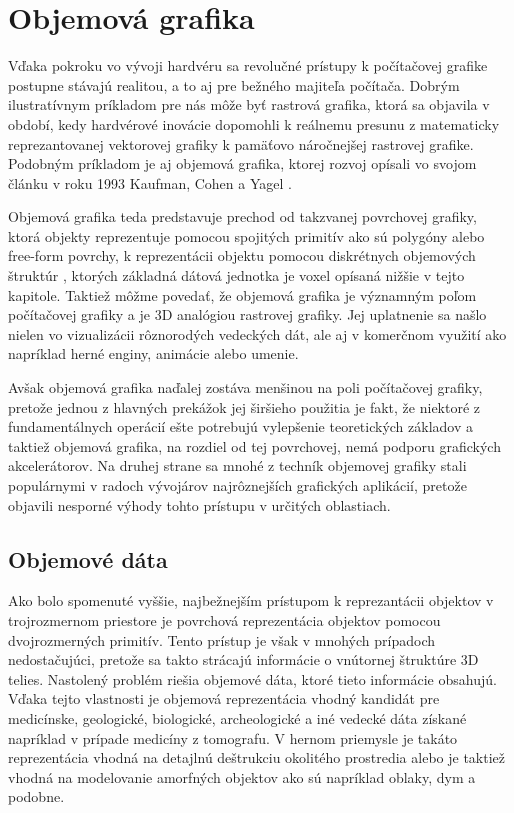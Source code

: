 \chapter{Objemová grafika}\label{chap:grafika}
Vďaka pokroku vo vývoji hardvéru sa revolučné prístupy k počítačovej grafike postupne stávajú realitou, a to aj pre bežného majiteľa počítača. Dobrým ilustratívnym príkladom pre nás môže byť rastrová grafika, ktorá sa objavila v období, kedy hardvérové inovácie dopomohli k reálnemu presunu z matematicky reprezantovanej vektorovej grafiky k pamäťovo náročnejšej rastrovej grafike.
Podobným príkladom je aj objemová grafika, ktorej rozvoj opísali vo svojom článku v roku 1993
Kaufman, Cohen a Yagel \cite{VolumeGraphics}.

Objemová grafika teda predstavuje prechod od takzvanej povrchovej grafiky, ktorá objekty reprezentuje pomocou spojitých primitív ako sú polygóny alebo free-form povrchy, k reprezentácii objektu pomocou diskrétnych objemových štruktúr \cite{Winter}, ktorých základná dátová jednotka je voxel opísaná nižšie v tejto kapitole.
Taktiež môžme povedať, že objemová grafika je významným poľom počítačovej grafiky a je 3D analógiou rastrovej grafiky. Jej uplatnenie sa našlo nielen vo vizualizácii rôznorodých vedeckých dát, ale aj v komerčnom využití ako napríklad herné enginy, animácie alebo umenie.

Avšak objemová grafika naďalej zostáva menšinou na poli počítačovej grafiky, pretože jednou z hlavných prekážok jej širšieho použitia je fakt, že niektoré z fundamentálnych operácií ešte potrebujú vylepšenie teoretických základov a taktiež objemová grafika, na rozdiel od tej povrchovej, nemá podporu grafických akcelerátorov. Na druhej strane sa mnohé z techník objemovej grafiky stali populárnymi v radoch
vývojárov najrôznejších grafických aplikácií, pretože objavili nesporné výhody tohto
prístupu v určitých oblastiach.
\cite{Tomas}

\section{Objemové dáta}
Ako bolo spomenuté vyššie, najbežnejším prístupom k reprezantácii objektov v trojrozmernom priestore je
povrchová reprezentácia objektov pomocou dvojrozmerných primitív. Tento prístup je však v mnohých prípadoch nedostačujúci, pretože sa takto strácajú informácie o vnútornej štruktúre 3D telies.
Nastolený problém riešia objemové dáta, ktoré tieto informácie obsahujú. Vďaka tejto vlastnosti je objemová reprezentácia vhodný kandidát pre medicínske, geologické, biologické, archeologické a iné vedecké dáta získané napríklad v prípade medicíny z tomografu.\cite{RealTime} V hernom priemysle je takáto reprezentácia vhodná na detajlnú deštrukciu okolitého prostredia alebo je taktiež vhodná na modelovanie amorfných objektov ako sú napríklad oblaky, dym a podobne. 

